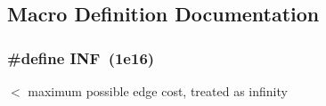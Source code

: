 \subsection{Macro Definition Documentation}
\subsubsection[{I\-N\-F}]{\setlength{\rightskip}{0pt plus 5cm}\#define I\-N\-F~(1e16)}\label{lib_2vertex_8h_a12c2040f25d8e3a7b9e1c2024c618cb6}


$<$ maximum possible edge cost, treated as infinity 

